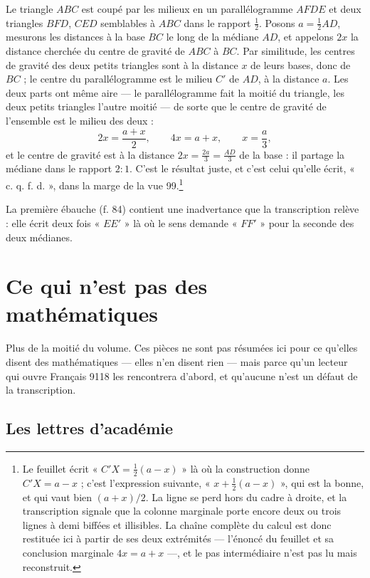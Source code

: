 \documentclass[11pt,a4paper]{article}
\begin{document}
Le triangle $ABC$ est coupé par les milieux en un parallélogramme $AFDE$ et
deux triangles $BFD$, $CED$ semblables à $ABC$ dans le rapport $\frac12$. Posons
$a = \frac12 AD$, mesurons les distances à la base $BC$ le long de la médiane
$AD$, et appelons $2x$ la distance cherchée du centre de gravité de $ABC$ à
$BC$. Par similitude, les centres de gravité des deux petits triangles sont à
la distance $x$ de leurs bases, donc de $BC$ ; le centre du parallélogramme
est le milieu $C'$ de $AD$, à la distance $a$. Les deux parts ont même aire —
le parallélogramme fait la moitié du triangle, les deux petits triangles
l'autre moitié — de sorte que le centre de gravité de l'ensemble est le milieu
des deux :
\[
  2x = \frac{a + x}{2}, \qquad 4x = a + x, \qquad x = \frac{a}{3},
\]
et le centre de gravité est à la distance $2x = \frac{2a}{3} = \frac{AD}{3}$
de la base : il partage la médiane dans le rapport $2 : 1$. C'est le résultat
juste, et c'est celui qu'elle écrit, « c. q. f. d. », dans la marge de la vue
99.\footnote{Le feuillet écrit « $C'X = \frac12(a-x)$ » là où la construction
donne $C'X = a - x$ ; c'est l'expression suivante, « $x + \frac12(a-x)$ », qui
est la bonne, et qui vaut bien $(a+x)/2$. La ligne se perd hors du cadre à
droite, et la transcription signale que la colonne marginale porte encore deux
ou trois lignes à demi biffées et illisibles. La chaîne complète du calcul est
donc restituée ici à partir de ses deux extrémités — l'énoncé du feuillet et
sa conclusion marginale $4x = a + x$ —, et le pas intermédiaire n'est pas lu
mais reconstruit.}

La première ébauche (f. 84) contient une inadvertance que la transcription
relève : elle écrit deux fois « $EE'$ » là où le sens demande « $FF'$ » pour la
seconde des deux médianes.

\section*{Ce qui n'est pas des mathématiques}

Plus de la moitié du volume. Ces pièces ne sont pas résumées ici pour ce
qu'elles disent des mathématiques — elles n'en disent rien — mais parce qu'un
lecteur qui ouvre Français 9118 les rencontrera d'abord, et qu'aucune n'est un
défaut de la transcription.

\subsection*{Les lettres d'académie}
\end{document}
